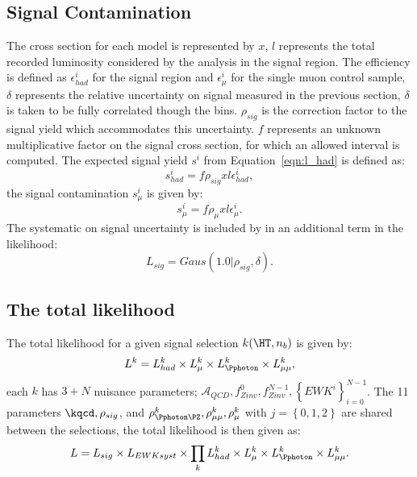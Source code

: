 \subsection{Signal Contamination} %
\label{par:signal_contamination}
The cross section for each model is represented by $x$, $l$ represents the 
total recorded luminosity considered by the analysis in the signal region. The 
efficiency is defined as $\epsilon^{i}_{had}$ for the signal region and 
$\epsilon^{i}_{\mu}$ for the single muon control sample, $\delta$ represents 
the relative uncertainty on signal measured in the previous section, $\delta$ 
is taken to be fully correlated though the \HT bins. $\rho_{sig}$ is the 
correction factor to the signal yield which accommodates this uncertainty. 
$f$ represents an unknown multiplicative factor on the signal cross 
section, for which an allowed interval is computed.
The expected signal yield $s^{i}$ from Equation~\eqref{eqn:l_had} is defined as:
\begin{equation}
  s^{i}_{had} = f \rho_{sig}xl\epsilon_{had}^{i},
  \label{eqn:sihad}
\end{equation}
the signal contamination $s^{i}_{\mu}$ is given by:
\begin{equation}
  s^{i}_{\mu} = f \rho_{\mu}xl\epsilon_{\mu}^{i}.
  \label{eqn:simu}
\end{equation}
The systematic on signal uncertainty is included by in an additional term in 
the likelihood:
\begin{equation}
  L_{sig} = Gaus\left(1.0|\rho_{sig},\delta \right).
\end{equation}
\subsection{The total likelihood} %
\label{par:the_total_likelihood}
The total likelihood for a given signal selection $k(\HT,n_b)$ is given by:
\begin{equation}
  L^{k} = L^{k}_{had}\times L^{k}_{\mu} \times L_{\Pphoton}^{k} \times L_{\mu\mu}^{k},
  \label{eqn:totallikelihood}
\end{equation}
each $k$ has $3+N$ nuisance parameters; $\mathcal{A}_{QCD}, f^{0}_{Zinv}, 
f^{N-1}_{Zinv}, \left\{EWK^{i}\right\}^{N-1}_{i=0}$. The 11 parameters $\kqcd, 
\rho_{sig}$, and $\rho_{\Pphoton\PZ}^{k}, \rho_{\mu\mu}^{k}, \rho_{\mu}^{k}$ 
with $j = \left\{0,1,2 \right\}$ are shared between the selections, the total 
likelihood is then given as:
\begin{equation}
  L = L_{sig} \times L_{EWK syst} \times \prod_{k} L^{k}_{had} \times L^{k}_{\mu} \times L^{k}_{\Pphoton} \times L^{k}_{\mu\mu}.
\end{equation}

